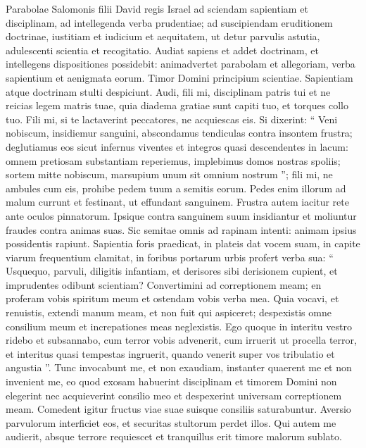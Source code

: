 \begin{biblechapter}
 \verse Parabolae Salomonis filii David regis Israel
 \verse ad sciendam sapientiam et disciplinam,
 ad intellegenda verba prudentiae;
 \verse ad suscipiendam eruditionem doctrinae,
 iustitiam et iudicium et aequitatem,
 \verse ut detur parvulis astutia,
 adulescenti scientia et recogitatio.
 \verse Audiat sapiens et addet doctrinam,
 et intellegens dispositiones possidebit:
 \verse animadvertet parabolam et allegoriam,
 verba sapientium et aenigmata eorum.
 \verse Timor Domini principium scientiae.
 Sapientiam atque doctrinam stulti despiciunt.
 \verse Audi, fili mi, disciplinam patris tui
 et ne reicias legem matris tuae,
 \verse quia diadema gratiae sunt capiti tuo,
 et torques collo tuo.
 \verse Fili mi, si te lactaverint peccatores,
 ne acquiescas eis.
 \verse Si dixerint: “ Veni nobiscum, insidiemur sanguini,
 abscondamus tendiculas contra insontem frustra;
 \verse deglutiamus eos sicut infernus viventes
 et integros quasi descendentes in lacum:
 \verse omnem pretiosam substantiam reperiemus,
 implebimus domos nostras spoliis;
 \verse sortem mitte nobiscum,
 marsupium unum sit omnium nostrum ”;
 \verse fili mi, ne ambules cum eis,
 prohibe pedem tuum a semitis eorum.
 \verse Pedes enim illorum ad malum currunt
 et festinant, ut effundant sanguinem.
 \verse Frustra autem iacitur rete ante oculos pinnatorum.
 \verse Ipsique contra sanguinem suum insidiantur
 et moliuntur fraudes contra animas suas.
 \verse Sic semitae omnis ad rapinam intenti:
 animam ipsius possidentis rapiunt.
 \verse Sapientia foris praedicat,
 in plateis dat vocem suam,
 \verse in capite viarum frequentium clamitat,
 in foribus portarum urbis profert verba sua:
 \verse “ Usquequo, parvuli, diligitis infantiam,
 et derisores sibi derisionem cupient,
 et imprudentes odibunt scientiam?
 \verse Convertimini ad correptionem meam;
 en proferam vobis spiritum meum
 et ostendam vobis verba mea.
 \verse Quia vocavi, et renuistis,
 extendi manum meam, et non fuit qui aspiceret;
 \verse despexistis omne consilium meum
 et increpationes meas neglexistis.
 \verse Ego quoque in interitu vestro ridebo
 et subsannabo, cum terror vobis advenerit,
 \verse cum irruerit ut procella terror,
 et interitus quasi tempestas ingruerit,
 quando venerit super vos tribulatio et angustia ”.
 \verse Tunc invocabunt me, et non exaudiam,
 instanter quaerent me et non invenient me,
 \verse eo quod exosam habuerint disciplinam
 et timorem Domini non elegerint
 \verse nec acquieverint consilio meo
 et despexerint universam correptionem meam.
 \verse Comedent igitur fructus viae suae
 suisque consiliis saturabuntur.
 \verse Aversio parvulorum interficiet eos,
 et securitas stultorum perdet illos.
 \verse Qui autem me audierit, absque terrore requiescet
 et tranquillus erit timore malorum sublato.
 

\end{biblechapter}
